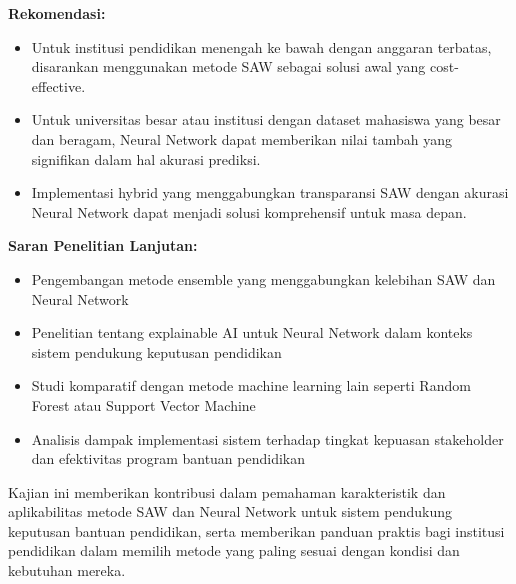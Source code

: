 \documentclass[10pt,a4paper]{article}
\begin{document}
\textbf{Rekomendasi:}
\begin{itemize}
    \item Untuk institusi pendidikan menengah ke bawah dengan anggaran terbatas, disarankan menggunakan metode SAW sebagai solusi awal yang cost-effective.
    
    \item Untuk universitas besar atau institusi dengan dataset mahasiswa yang besar dan beragam, Neural Network dapat memberikan nilai tambah yang signifikan dalam hal akurasi prediksi.
    
    \item Implementasi hybrid yang menggabungkan transparansi SAW dengan akurasi Neural Network dapat menjadi solusi komprehensif untuk masa depan.
\end{itemize}

\textbf{Saran Penelitian Lanjutan:}
\begin{itemize}
    \item Pengembangan metode ensemble yang menggabungkan kelebihan SAW dan Neural Network
    \item Penelitian tentang explainable AI untuk Neural Network dalam konteks sistem pendukung keputusan pendidikan
    \item Studi komparatif dengan metode machine learning lain seperti Random Forest atau Support Vector Machine
    \item Analisis dampak implementasi sistem terhadap tingkat kepuasan stakeholder dan efektivitas program bantuan pendidikan
\end{itemize}

Kajian ini memberikan kontribusi dalam pemahaman karakteristik dan aplikabilitas metode SAW dan Neural Network untuk sistem pendukung keputusan bantuan pendidikan, serta memberikan panduan praktis bagi institusi pendidikan dalam memilih metode yang paling sesuai dengan kondisi dan kebutuhan mereka.



\end{document}
